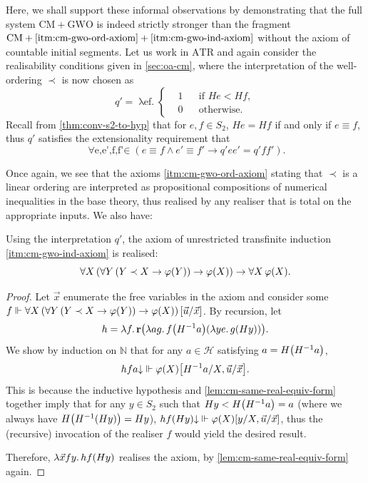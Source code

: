 \documentclass[12pt,openany]{book}
\theoremstyle{plain}
\theoremstyle{definition}
\newcommand\opA[1]{\mathop{\forall #1}}
\newcommand\oplam[1]{\mathop{\lambda #1.}}
\newcommand\ATR{\mathrm{ATR}}
\newcommand\CM{\mathrm{CM}}
\newcommand\GWO{\mathrm{GWO}}
\newcommand\br{\mathbf{r}}
\begin{document}
Here, we shall support these informal observations by demonstrating that the full system $\CM + \GWO$ is indeed strictly stronger than the fragment $\CM + \text{\ref{itm:cm-gwo-ord-axiom}} + \text{\ref{itm:cm-gwo-ind-axiom}}$ without the axiom of countable initial segments. Let us work in $\ATR$ and again consider the realisability conditions given in \autoref{sec:oa-cm}, where the interpretation of the well-ordering $\prec$ is now chosen as
\[q' = \oplam{ef} \left\{\begin{aligned}
     & 1 &  & \text{if $He < Hf$}, \\
     & 0 &  & \text{otherwise}.
  \end{aligned}\right.\]
Recall from \autoref{thm:conv-s2-to-hyp} that for $e, f \in S_2$, $He = Hf$ if and only if $e \equiv f$, thus $q'$ satisfies the extensionality requirement that
\[\opA{e, e', f, f' \in S_2} \left(e \equiv f \land e' \equiv f' \rightarrow q' e e' = q' f f'\right).\]

Once again, we see that the axioms \ref{itm:cm-gwo-ord-axiom} stating that $\prec$ is a linear ordering are interpreted as propositional compositions of numerical inequalities in the base theory, thus realised by any realiser that is total on the appropriate inputs. We also have:

\begin{proposition}[$\ATR$]
  Using the interpretation $q'$, the axiom of unrestricted transfinite induction \ref{itm:cm-gwo-ind-axiom} is realised:
  \[\opA{X} \left(\opA{Y} \left(Y \prec X \rightarrow \varphi\mleft(Y\mright)\right) \rightarrow \varphi\mleft(X\mright)\right) \rightarrow \opA{X} \varphi\mleft(X\mright).\]
\end{proposition}

\begin{proof}
  Let $\vec{x}$ enumerate the free variables in the axiom and consider some $f \Vdash \opA{X} \left(\opA{Y} \left(Y \prec X \rightarrow \varphi\mleft(Y\mright)\right) \rightarrow \varphi\mleft(X\mright)\right)\mleft[\vec{u}/\vec{x}\mright]$. By recursion, let
  \[h = \oplam{f} \br \mleft(\oplam{ag} f \mleft(H^{-1} a\mright) \mleft(\oplam{ye} g \mleft(Hy\mright)\mright)\mright).\]
  We show by induction on $\mathbb{N}$ that for any $a \in \mathcal{H}$ satisfying $a = H \mleft(H^{-1} a\mright)$,
  \[hfa {\downarrow} \Vdash \varphi\mleft(X\mright)\mleft[H^{-1} a/X, \vec{u}/\vec{x}\mright].\]
  This is because the inductive hypothesis and \autoref{lem:cm-same-real-equiv-form} together imply that for any $y \in S_2$ such that $Hy < H \mleft(H^{-1} a\mright) = a$ (where we always have $H \mleft(H^{-1} \mleft(Hy\mright)\mright) = Hy$), $hf \mleft(Hy\mright) {\downarrow} \Vdash \varphi\mleft(X\mright)\mleft[y/X, \vec{u}/\vec{x}\mright]$, thus the (recursive) invocation of the realiser $f$ would yield the desired result.

  Therefore, $\oplam{\vec{x} fy} hf \mleft(Hy\mright)$ realises the axiom, by \autoref{lem:cm-same-real-equiv-form} again.
\end{proof}
\end{document}
